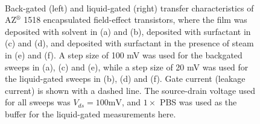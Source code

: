 \documentclass[
  a4paper,
]{scrbook}
\begin{document}
\begin{figure}
\begin{minipage}[t]{0.45\linewidth}
{{}

}

\end{minipage}%
%
\begin{minipage}[t]{0.01\linewidth}

{\centering 

~

}

\end{minipage}%

\caption{\label{fig-pristine-cnt-characteristics}Back-gated (left) and
liquid-gated (right) transfer characteristics of AZ\(^\circledR\) 1518
encapsulated field-effect transistors, where the film was deposited with
solvent in (a) and (b), deposited with surfactant in (c) and (d), and
deposited with surfactant in the presence of steam in (e) and (f). A
step size of 100 mV was used for the backgated sweeps in (a), (c) and
(e), while a step size of 20 mV was used for the liquid-gated sweeps in
(b), (d) and (f). Gate current (leakage current) is shown with a dashed
line. The source-drain voltage used for all sweeps was
\(V_{ds} = 100 \textrm{mV}\), and \(1 \times\) PBS was used as the
buffer for the liquid-gated measurements here.}

\end{figure}
\end{document}
